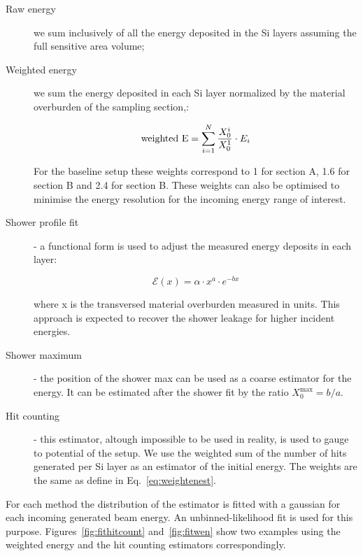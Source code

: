 \begin{description}

\item[Raw energy] we sum inclusively of all the energy deposited in
  the Si layers assuming the full sensitive area volume;

\item[Weighted energy] we sum the energy deposited in each Si layer
  normalized by the material overburden of the sampling section,\ie:

\begin{equation}
{\rm weighted~E}=\sum_{i=1}^{N} \frac{X_0^i}{X_0^1}\cdot E_i
\label{eq:weightenest}
\end{equation}

For the baseline setup these weights correspond to 1 for section A,
1.6 for section B and 2.4 for section B.
These weights can also be optimised to minimise the energy resolution
for the incoming energy range of interest.

\item[Shower profile fit] - a functional form is used to adjust the
  measured energy deposits in each layer:

\begin{equation}
\mathcal{E}(x)=\alpha\cdot x^{a} \cdot e^{-bx} 
\label{eq:showerprof}
\end{equation}

where x is the transversed material overburden measured in \Xnot
units. This approach is expected to recover the shower leakage for
higher incident energies.

\item[Shower maximum] - the position of the shower max can be used as a
  coarse estimator for the energy. It can be estimated after the
  shower fit by the ratio $X_{0}^{\max}=b/a$.

\item[Hit counting] - this estimator, altough impossible to be used in
  reality, is used to gauge to potential of the setup. We use the
  weighted sum  of the number of hits generated per Si layer as an
  estimator of the initial energy. The weights are the same as define
  in Eq.~\ref{eq:weightenest}.

\end{description}

For each method the distribution of the estimator is fitted with a
gaussian for each incoming generated beam energy. An unbinned-likelihood fit is
used for this purpose. Figures~\ref{fig:fithitcount}
and~\ref{fig:fitwen}
show two examples using the weighted energy and the hit counting
estimators correspondingly.

